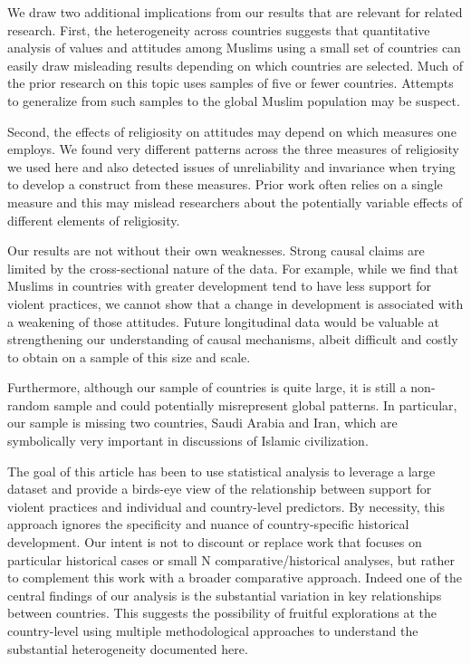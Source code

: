 \documentclass[10pt,letterpaper]{article}
\begin{document}
We draw two additional implications from our results that are relevant for related research. First, the heterogeneity across countries suggests that quantitative analysis of values and attitudes among Muslims using a small set of countries can easily draw misleading results depending on which countries are selected. Much of the prior research on this topic uses samples of five or fewer countries. Attempts to generalize from such samples to the global Muslim population may be suspect.

Second, the effects of religiosity on attitudes may depend on which measures one employs. We found very different patterns across the three measures of religiosity we used here and also detected issues of unreliability and invariance when trying to develop a construct from these measures. Prior work often relies on a single measure and this may mislead researchers about the potentially variable effects of different elements of religiosity.

Our results are not without their own weaknesses. Strong causal claims are limited by the cross-sectional nature of the data. For example, while we find that Muslims in countries with greater development tend to have less support for violent practices, we cannot show that a change in development is associated with a weakening of those attitudes. Future longitudinal data would be valuable at strengthening our understanding of causal mechanisms, albeit difficult and costly to obtain on a sample of this size and scale.

Furthermore, although our sample of countries is quite large, it is still a non-random sample and could potentially misrepresent global patterns. In particular, our sample is missing two countries, Saudi Arabia and Iran, which are symbolically very important in discussions of Islamic civilization.

The goal of this article has been to use statistical analysis to leverage a large dataset and provide a birds-eye view of the relationship between support for violent practices and individual and country-level predictors. By necessity, this approach ignores the specificity and nuance of country-specific historical development. Our intent is not to discount or replace work that focuses on particular historical cases or small N comparative/historical analyses, but rather to complement this work with a broader comparative approach. Indeed one of the central findings of our analysis is the substantial variation in key relationships between countries. This suggests the possibility of fruitful explorations at the country-level using multiple methodological approaches to understand the substantial heterogeneity documented here.
\end{document}
